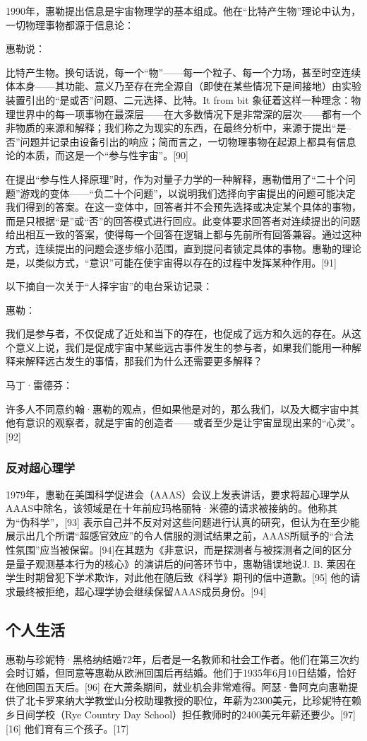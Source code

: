 1990年，惠勒提出信息是宇宙物理学的基本组成。他在“比特产生物”理论中认为，一切物理事物都源于信息论：

惠勒说：

比特产生物。换句话说，每一个“物”——每一个粒子、每一个力场，甚至时空连续体本身——其功能、意义乃至存在完全源自（即使在某些情况下是间接地）由实验装置引出的“是或否”问题、二元选择、比特。It from bit 象征着这样一种理念：物理世界中的每一项事物在最深层——在大多数情况下是非常深的层次——都有一个非物质的来源和解释；我们称之为现实的东西，在最终分析中，来源于提出“是–否”问题并记录由设备引出的响应；简而言之，一切物理事物在起源上都具有信息论的本质，而这是一个“参与性宇宙”。[90]

在提出“参与性人择原理”时，作为对量子力学的一种解释，惠勒借用了“二十个问题”游戏的变体——“负二十个问题”，以说明我们选择向宇宙提出的问题可能决定我们得到的答案。在这一变体中，回答者并不会预先选择或决定某个具体的事物，而是只根据“是”或“否”的回答模式进行回应。此变体要求回答者对连续提出的问题给出相互一致的答案，使得每一个回答在逻辑上都与先前所有回答兼容。通过这种方式，连续提出的问题会逐步缩小范围，直到提问者锁定具体的事物。惠勒的理论是，以类似方式，“意识”可能在使宇宙得以存在的过程中发挥某种作用。[91]

以下摘自一次关于“人择宇宙”的电台采访记录：

惠勒：

我们是参与者，不仅促成了近处和当下的存在，也促成了远方和久远的存在。从这个意义上说，我们是促成宇宙中某些远古事件发生的参与者，如果我们能用一种解释来解释远古发生的事情，那我们为什么还需要更多解释？

马丁·雷德芬：

许多人不同意约翰·惠勒的观点，但如果他是对的，那么我们，以及大概宇宙中其他有意识的观察者，就是宇宙的创造者——或者至少是让宇宙显现出来的“心灵”。[92]
\subsubsection{反对超心理学}
1979年，惠勒在美国科学促进会（AAAS）会议上发表讲话，要求将超心理学从AAAS中除名，该领域是在十年前应玛格丽特·米德的请求被接纳的。他称其为“伪科学”，[93] 表示自己并不反对对这些问题进行认真的研究，但认为在至少能展示出几个所谓“超感官效应”的令人信服的测试结果之前，AAAS所赋予的“合法性氛围”应当被保留。[94]在其题为《非意识，而是探测者与被探测者之间的区分是量子观测基本行为的核心》的演讲后的问答环节中，惠勒错误地说J. B. 莱因在学生时期曾犯下学术欺诈，对此他在随后致《科学》期刊的信中道歉。[95] 他的请求最终被拒绝，超心理学协会继续保留AAAS成员身份。[94]
\subsection{个人生活}
惠勒与珍妮特·黑格纳结婚72年，后者是一名教师和社会工作者。他们在第三次约会时订婚，但同意等惠勒从欧洲回国后再结婚。他们于1935年6月10日结婚，恰好在他回国五天后。[96] 在大萧条期间，就业机会非常难得。阿瑟·鲁阿克向惠勒提供了北卡罗来纳大学教堂山分校助理教授的职位，年薪为2300美元，比珍妮特在赖乡日间学校（Rye Country Day School）担任教师时的2400美元年薪还要少。[97][16] 他们育有三个孩子。[17]


